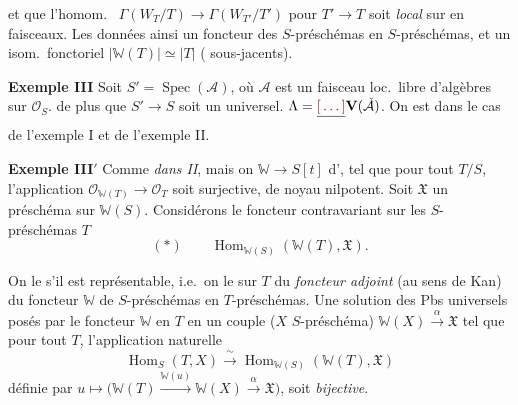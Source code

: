 \documentclass[11pt,a4paper]{article}
\begin{document}

\struck{\ill{}} et que l'homom.\ 
$\Gamma(W_T/T) \to \Gamma(W_{T'}/T')$ pour $T' \to T$  soit
\emph{local} sur \ill{} \ill{} en faisceaux. Les données \ill{} ainsi un
foncteur    \ill{} des
$S$-préschémas en $S$-préschémas, et un isom.\ fonctoriel
$|\mathbb{W}(T)| \simeq |T|$ ( sous-jacents).

\textbf{Exemple III} Soit $S' = \operatorname{Spec}(\mathcal{A})$, où
$\mathcal{A}$ est un faisceau loc.\ libre d'algèbres \ill{} sur
$\mathcal{O}_S$.  de plus que $S' \to S$
soit un  universel. 
$\Lambda = \struck{\ill{}} \mathbf{V}(\check{\mathcal{A}})$. On est 
 dans le cas de l'exemple I et de l'exemple II.

\textbf{Exemple III$'$} Comme \emph{dans II}, mais on 
\ill{} \ill{} $\mathbb{W} \to S[t]$ d', tel que pour tout
$T/S$, l'application 
$\mathcal{O}_{\mathbb{W}(T)} \to \mathcal{O}_T$ soit surjective, de noyau
nilpotent. Soit $\mathfrak{X}$ un préschéma sur
$\mathbb{W}(S)$. Considérons le foncteur contravariant
sur les $S$-préschémas $T$
\[
  (*) \qquad \operatorname{Hom}_{\mathbb{W}(S)}(\mathbb{W}(T), \mathfrak{X}) .
\]

On \struck{\ill{}} le  s'il est représentable,
i.e.\ on  le  sur $T$ du
\emph{foncteur adjoint} (au sens de Kan) du
foncteur $\mathbb{W}$ de $S$-préschémas en $T$-préschémas. Une solution des Pbs
universels posés par le foncteur $\mathbb{W}$ en $T$ 
en un couple ($X$ $S$-préschéma) $\mathbb{W}(X)
\xrightarrow{\alpha} \mathfrak{X}$ tel que pour tout $T$, l'application
naturelle
\[
  \operatorname{Hom}_{S}(T, X) \xrightarrow{\ \sim\ }
  \operatorname{Hom}_{\mathbb{W}(S)}(\mathbb{W}(T), \mathfrak{X})
\]
 définie par $u \mapsto \bigl(\mathbb{W}(T)
\xrightarrow{\mathbb{W}(u)} \mathbb{W}(X) \xrightarrow{\alpha}
\mathfrak{X}\bigr)$, soit \emph{bijective}.
\end{document}
